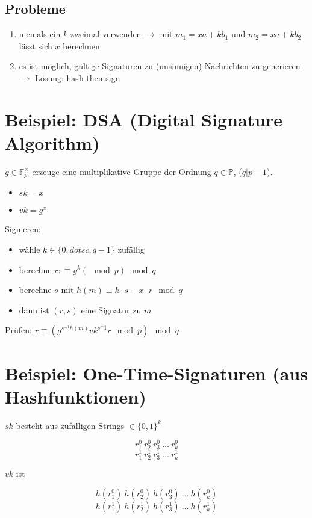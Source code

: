 \documentclass[a4paper,twoside,DIV15,BCOR12mm]{scrbook}
\begin{document}
\subsection{Probleme}

\begin{enumerate}
	\item niemals ein $k$ zweimal verwenden $\rightarrow$ mit $m_1 = xa +kb_1$ und $m_2 = xa + kb_2$ lässt sich $x$ berechnen
	\item es ist möglich, gültige Signaturen zu (unsinnigen) Nachrichten zu generieren $\rightarrow$ Lösung: hash-then-sign
\end{enumerate}

\section{Beispiel: DSA (Digital Signature Algorithm)}

$g \in \mathbb{F}_p^\times$ erzeuge eine multiplikative Gruppe der Ordnung $q \in \mathbb{P}$, ($q | p-1$).

\begin{itemize}
	\item $sk = x$
	\item $vk = g^x$
\end{itemize}

Signieren:

\begin{itemize}
	\item wähle $k \in \{0, dotsc, q-1\}$ zufällig
	\item berechne $r :\equiv g^k (\mod{p}) \mod{q}$
	\item berechne $s$ mit $h(m) \equiv k\cdot s - x \cdot r \mod{q}$
	\item dann ist $(r,s)$ eine Signatur zu $m$
\end{itemize}

Prüfen: $r \equiv (g^{s^{-1}h(m)} vk^{s^-1}r \mod{p}) \mod{q}$

\section{Beispiel: One-Time-Signaturen (aus Hashfunktionen)}
		
$sk$ besteht aus zufälligen Strings $\in {\{0,1 \}}^k$

$$r_1^0\ r_2^0\ r_3^0\ \ldots\ r_k^0$$
$$r_1^1\ r_2^1\ r_3^1\ \ldots\ r_k^1$$

$vk$ ist

$$h(r_1^0)\ h(r_2^0)\ h(r_3^0)\ \ldots\ h(r_k^0)$$
$$h(r_1^1)\ h(r_2^1)\ h(r_3^1)\ \ldots\ h(r_k^1)$$
\end{document}
